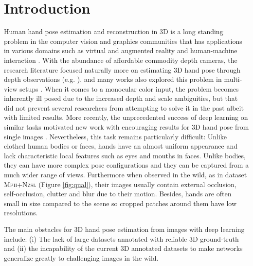 \documentclass[10pt,twocolumn,letterpaper]{article}
\begin{document}
\section{Introduction}
Human hand pose estimation and reconstruction in 3D is a long standing problem in the computer vision and graphics communities that has applications in various domains such as virtual and augmented reality and human-machine interaction \cite{piumsomboon2013user,jang20153d,Song:2014:IGA:2642918.2647373,hurst2013gesture}.
With the abundance of affordable commodity depth cameras, the research literature focused naturally more on estimating 3D hand pose through depth observations (e.g. 
\cite{Wu_2018_ECCV,Zhou_2018_ECCV,Ge_2018_CVPR,Poier2018cvpr_preview,Wan_2018_CVPR}), and many works also explored this problem in multi-view setups 
\cite{panteleris2017back,zhang20163d,rosales20013d,de2006regression,
oikonomidis2010markerless,ellipsoidtracker_3dv2014}. When it comes to a monocular color input, the problem becomes inherently ill posed due to the increased depth and scale ambiguities, but that did not prevent several researchers \cite{1211500,de2011model,stenger2001model,thayananthan2003shape,wu2001capturing,5509753} from attempting to solve it in the past albeit with limited results. More recently, the unprecedented success of deep learning on similar tasks motivated new work with encouraging results for 3D hand pose from single images \cite{zimmermann2017learning,GANeratedHands_CVPR2018,cai2018weakly,spurr2018cross,iqbal2018hand}. Nevertheless, this task remains particularly difficult: Unlike clothed human bodies or faces, hands have an almost uniform appearance and lack characteristic local features such as eyes and mouths in faces. Unlike bodies, they can have more complex pose configurations and they can be captured from a much wider range of views. Furthermore when observed in the wild, as in dataset \textsc{Mpii+Nzsl} \cite{simon2017hand} (Figure \ref{fig:qual}), their images usually contain external occlusion, self-occlusion, clutter and blur due to their motion. Besides, hands are often small in size compared to the scene so cropped patches around them have low resolutions.   
      
The main obstacles for 3D hand pose estimation from images with deep learning include: (i) The lack of large datasets annotated with reliable 3D ground-truth and (ii) the incapability of the current 3D annotated datasets to make networks generalize greatly to challenging images in the wild. 
\end{document}
